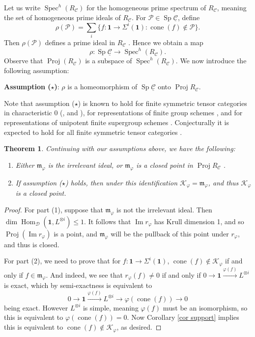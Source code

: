 \documentclass[11pt]{amsart}
\def\im{\operatorname{Im}}
\def\dim{\operatorname{dim}}
\def\Hom{\operatorname{Hom}}
\def\KK{\mathcal{K}}
\def\PP{\mathcal{P}}
\def\Cs{\mathcal{C}}
\def\Cs{\mathscr{C}}
\def\Ds{\mathscr{D}}
\def\m{\mathfrak{m}}
\def\Spec{\operatorname{Spec}}
\def\ul{\underline}
\def\Sp{\operatorname{Sp}}
\def\xto{\xrightarrow}
\newtheorem{thm}{Theorem}[section]
\theoremstyle{definition}
\theoremstyle{remark}
\numberwithin{equation}{section}
\begin{document}
Let us write $\Spec^h(R_{\Cs})$ for the homogeneous prime spectrum of $R_{\Cs}$, meaning the set of homogeneous prime ideals of $R_{\Cs}$.  For $\PP\in\Sp\ul{\Cs}$, define
\[
\rho(\PP)=\sum\limits_{i}\{f:\mathbf{1}\to\Sigma^i(\mathbf{1}):\operatorname{cone}(f)\notin\PP\}.
\]
Then $\rho(\PP)$ defines a prime ideal in $R_{\Cs}$ \cite[Thm.~5.3]{Bal}.  Hence we obtain a map
\[
\rho:\Sp\ul{\Cs}\to\Spec^h(R_{\Cs}).
\]
Observe that $\operatorname{Proj}(R_{\Cs})$ is a subspace of $\Spec^h(R_{\Cs})$.  We now introduce the following assumption:
\begin{center}
    \textbf{Assumption ($\star$)}: $\rho$ is a homeomorphism of $\Sp\ul{\Cs}$ onto $\operatorname{Proj}R_{\Cs}.$
\end{center}

Note that assumption ($\star$) is known to hold for finite symmetric tensor categories in characteristic 0 (\cite{BKN}, \cite{HV} and \cite{DK}), for representations of finite group schemes \cite{BIKP}, and for representations of unipotent finite supergroup schemes \cite{BIKP2}.  Conjecturally it is expected to hold for all finite symmetric tensor categories \cite{NVY}.

\begin{thm}\label{thm m_phi maximal}
   Continuing with our assumptions above, we have the following:
    \begin{enumerate}
        \item Either $\m_{\varphi}$ is the irrelevant ideal, or $\m_{\varphi}$ is a closed point in $\operatorname{Proj}R_{\Cs}$ .
        \item If assumption ($\star$) holds, then under this identification $\KK_{\varphi}=\m_{\varphi}$, and thus $\KK_{\varphi}$ is a closed point.
    \end{enumerate}
\end{thm}

\begin{proof}
    For part (1), suppose that $\m_{\varphi}$ is not the irrelevant ideal. Then $\dim\Hom_{\Ds}(\mathbf{1},L^{\otimes i})\leq 1$.  It follows that $\im r_{\varphi}$ has Krull dimension 1, and so $\operatorname{Proj}(\im r_{\varphi})$ is a point, and $\m_{\varphi}$ will be the pullback of this point under $r_{\varphi}$, and thus is closed.

    For part (2), we need to prove that for $f:\mathbf{1}\to\Sigma^i(\mathbf{1})$, $\operatorname{cone}(f)\notin\KK_{\varphi}$ if and only if $f\in\m_{\varphi}$. And indeed, we see that $r_{\varphi}(f)\neq 0$ if and only if $0\to \mathbf{1}\xto{\varphi(f)}L^{\otimes i}$ is exact, which by semi-exactness is equivalent to
    \[
    0\to \mathbf{1}\xto{\varphi(f)}L^{\otimes i}\to\varphi(\operatorname{cone}(f))\to0
    \]
    being exact.  However $L^{\otimes i}$ is simple, meaning $\varphi(f)$ must be an isomorphism, so this is equivalent to $\varphi(\operatorname{cone}(f))=0$.  Now Corollary \ref{cor support} implies this is equivalent to $\operatorname{cone}(f)\notin \KK_{\varphi}$, as desired. 
\end{proof}
\end{document}
